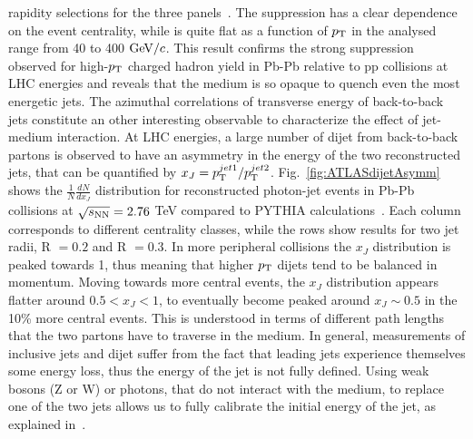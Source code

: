 rapidity selections for the three panels~\cite{Aad:2014bxa}. The 
suppression has a clear dependence on the event centrality, while 
is quite flat as a function of $p_{\rm T}$ in the analysed range from 40 to 400 $\mathrm{GeV}/c$. 
This result confirms the strong suppression observed for high-$p_{\rm T}$ 
charged hadron yield in Pb-Pb relative to pp collisions at LHC energies and reveals that the 
medium is so opaque to quench even the most energetic jets. The 
azimuthal correlations of transverse energy of back-to-back jets 
constitute an other interesting observable to characterize the effect 
of jet-medium interaction. At LHC energies, a large number of dijet 
from back-to-back partons is observed to have an asymmetry in the energy 
of the two reconstructed jets, that can be quantified by 
$x_J = p_{\rm T}^{jet1}/p_{\rm T}^{jet2}$. Fig.~\ref{fig:ATLASdijetAsymm} shows the $\frac{1}{N}\frac{dN}{dx_J}$ 
distribution for reconstructed photon-jet events in Pb-Pb collisions at $\sqrt{s_{\rm NN}} = 2.76$ TeV 
compared to PYTHIA calculations~\cite{ATLAS-CONF-2012-121}. 
Each column corresponds to different centrality classes, while the 
rows show results for two jet radii, R $= 0.2$ and R $=0.3$. In more 
peripheral collisions the $x_J$ distribution is peaked towards 1, thus 
meaning that higher $p_{\rm T}$ dijets tend to be balanced in momentum. 
Moving towards more central events, the $x_J$ distribution appears 
flatter around $0.5 < x_J<1$, to eventually become peaked around 
$x_J \sim 0.5$ in the 10\% more central events.
This is understood in terms of different path 
lengths that the two partons have to traverse in the medium. In general, 
measurements of inclusive jets and dijet suffer from the fact that leading jets 
experience themselves some energy loss, thus the energy of the jet is not 
fully defined. Using weak bosons (Z or W) or photons, that do not interact 
with the medium, to replace one of the two jets allows us to fully calibrate the 
initial energy of the jet, as explained in~\cite{Wang:1996yh}. 

